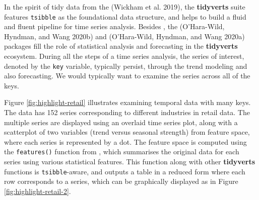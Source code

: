 In the spirit of tidy data from the  (Wickham et al. 2019), the \textbf{tidyverts} suite features \texttt{tsibble} as the foundational data structure, and helps to build a fluid and fluent pipeline for time series analysis. Besides , the  (O'Hara-Wild, Hyndman, and Wang 2020b) and  (O'Hara-Wild, Hyndman, and Wang 2020a) packages fill the role of statistical analysis and forecasting in the \textbf{tidyverts} ecosystem. During all the steps of a time series analysis, the series of interest, denoted by the \texttt{key} variable, typically persist, through the trend modeling and also forecasting. We would typically want to examine the series across all of the keys.

Figure \ref{fig:highlight-retail} illustrates examining temporal data with many keys. The data has 152 series corresponding to different industries in retail data. The multiple series are displayed using an overlaid time series plot, along with a scatterplot of two variables (trend versus seasonal strength) from feature space, where each series is represented by a dot. The feature space is computed using the \texttt{features()} function from , which summarises the original data for each series using various statistical features. This function along with other \textbf{tidyverts} functions is \texttt{tsibble}-aware, and outputs a table in a reduced form where each row corresponds to a series, which can be graphically displayed as in Figure \ref{fig:highlight-retail-2}.

